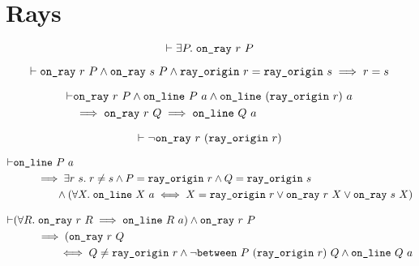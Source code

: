 \section{Rays}
\begin{equation*}
  \vdash\exists P.\; \texttt{on\_ray}\ r\ P
\end{equation*}

\begin{equation*}
    \vdash\texttt{on\_ray}\ r\ P \wedge \texttt{on\_ray}\ s\ P\wedge\texttt{ray\_origin}\ r = \texttt{ray\_origin}\ s\implies r = s
\end{equation*}

\begin{equation*}
  \begin{split}
    \vdash&\texttt{on\_ray}\ r\ P \wedge \texttt{on\_line}\ P\ a \wedge \texttt{on\_line}\ (\texttt{ray\_origin}\ r)\ a\\
    &\implies \texttt{on\_ray}\ r\ Q \implies \texttt{on\_line}\ Q\ a
  \end{split}
\end{equation*}

\begin{equation*}
\vdash\neg\texttt{on\_ray}\ r\ (\texttt{ray\_origin}\ r)
\end{equation*}

\begin{equation*}
  \begin{split}
    \vdash&\texttt{on\_line}\ P\ a\\
    &\qquad\implies \exists r\ s.\; r \neq s\wedge P = \texttt{ray\_origin}\ r \wedge Q = \texttt{ray\_origin}\ s\\
    &\qquad\qquad \wedge (\forall X.\; \texttt{on\_line}\ X\ a \iff X = \texttt{ray\_origin}\ r \vee \texttt{on\_ray}\ r\ X \vee \texttt{on\_ray}\ s\ X)
    \end{split}
\end{equation*}

\begin{equation*}
  \begin{split}
    \vdash&(\forall R.\; \texttt{on\_ray}\ r\ R \implies \texttt{on\_line}\ R\ a) \wedge \texttt{on\_ray}\ r\ P\\
    &\qquad\implies (\texttt{on\_ray}\ r\ Q\\
    &\qquad\qquad\iff Q \neq \texttt{ray\_origin}\ r \wedge \neg\texttt{between}\ P\ (\texttt{ray\_origin}\ r)\ Q \wedge \texttt{on\_line}\ Q\ a
  \end{split}
\end{equation*}
